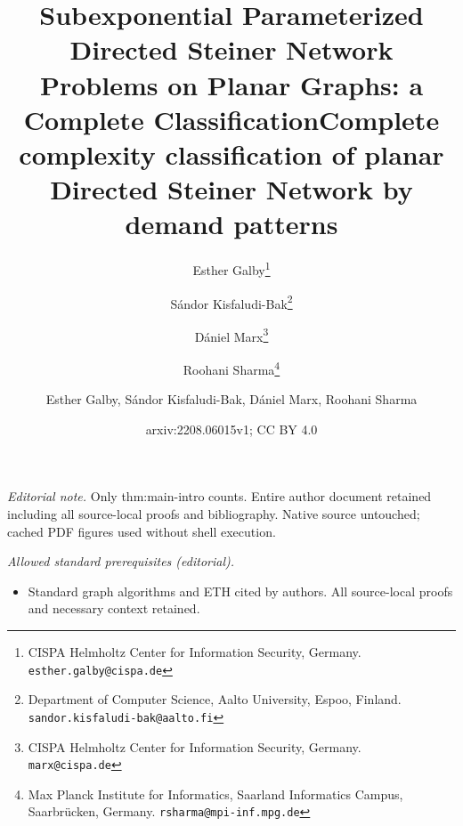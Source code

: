 \documentclass[a4paper,11pt]{article}
\title{Subexponential Parameterized Directed Steiner Network Problems on Planar Graphs: a Complete Classification}
\author{Esther Galby\thanks{CISPA Helmholtz Center for Information Security, Germany. \texttt{esther.galby@cispa.de}} \and S\' andor Kisfaludi-Bak\thanks{Department of Computer Science, Aalto University, Espoo, Finland. \texttt{sandor.kisfaludi-bak@aalto.fi}} \and D\' aniel Marx\thanks{CISPA Helmholtz Center for Information Security, Germany. \texttt{marx@cispa.de}}\and  Roohani Sharma\thanks{Max Planck Institute for Informatics, Saarland Informatics Campus, Saarbr\"ucken, Germany.  \texttt{rsharma@mpi-inf.mpg.de}}}
\date{}
\title{Complete complexity classification of planar Directed Steiner Network by demand patterns}
\author{Esther Galby, Sándor Kisfaludi-Bak, Dániel Marx, Roohani Sharma}
\date{arxiv:2208.06015v1; CC BY 4.0}
\theoremstyle{plain}
\newtheorem{identification rule}{Identification Rule}
\theoremstyle{definition}
\theoremstyle{remark}
\begin{document}
\maketitle
\noindent\textit{Editorial note.} Only thm:main-intro counts. Entire author document retained including all source-local proofs and bibliography. Native source untouched; cached PDF figures used without shell execution.\par\medskip
\noindent\textit{Allowed standard prerequisites (editorial).}\begin{itemize}
\item Standard graph algorithms and ETH cited by authors. All source-local proofs and necessary context retained.
\end{itemize}\medskip
 \maketitle
\end{document}
